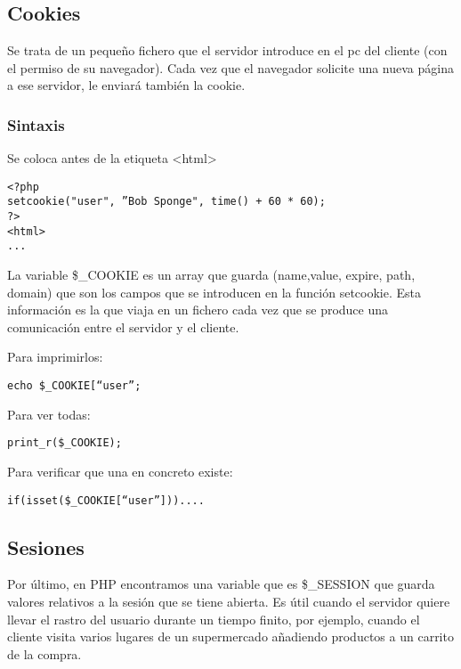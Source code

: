 \documentclass{apuntes}
\begin{document}
\subsection{Cookies}
Se trata de un pequeño fichero que el servidor introduce en el pc del cliente (con el permiso de su navegador). Cada vez que el navegador solicite una nueva página  a ese servidor, le enviará también la cookie.

\subsubsection{Sintaxis}
Se coloca antes de la etiqueta <html>
\begin{verbatim}
<?php
setcookie("user", ”Bob Sponge", time() + 60 * 60);
?>
<html>
...
\end{verbatim}

La variable \$\_COOKIE es un array que guarda (name,value, expire, path, domain) que son los campos que se introducen en la función setcookie. Esta información es la que viaja en un fichero cada vez que se produce una comunicación entre el servidor y el cliente.

Para imprimirlos:

\begin{verbatim}
echo $_COOKIE[“user”;
\end{verbatim}
Para ver todas:
\begin{verbatim}
print_r($_COOKIE);
\end{verbatim}
Para verificar que una en concreto existe:
\begin{verbatim}
if(isset($_COOKIE[“user”]))....
\end{verbatim}

\subsection{Sesiones}
Por último, en PHP encontramos una variable que es \$\_SESSION que guarda valores relativos a la sesión que se tiene abierta. Es útil cuando el servidor quiere llevar el rastro del usuario durante un tiempo finito, por ejemplo, cuando el cliente visita varios lugares de un supermercado añadiendo productos a un carrito de la compra.
\end{document}

